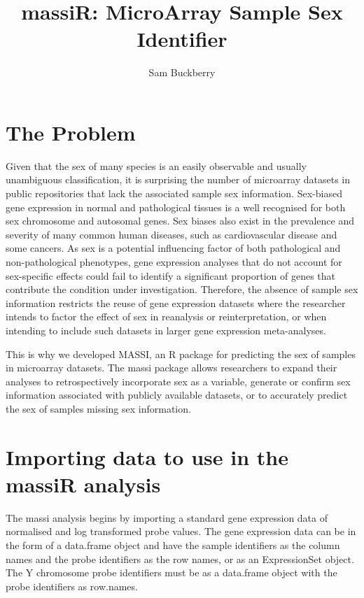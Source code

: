 \documentclass{article}
\begin{document}


\title{massiR: MicroArray Sample Sex Identifier}
\author{Sam Buckberry}
\maketitle

\section{The Problem}
Given that the sex of many species is an easily observable and usually unambiguous classification, it is surprising the number of microarray datasets in public repositories that lack the associated sample sex information. Sex-biased gene expression in normal and pathological tissues is a well recognised for both sex chromosome and autosomal genes. Sex biases also exist in the prevalence and severity of many common human diseases, such as cardiovascular disease and some cancers. As sex is a potential influencing factor of both pathological and non-pathological phenotypes, gene expression analyses that do not account for sex-specific effects could fail to identify a significant proportion of genes that contribute the condition under investigation. Therefore, the absence of sample sex information restricts the reuse of gene expression datasets where the researcher intends to factor the effect of sex in reanalysis or reinterpretation, or when intending to include such datasets in larger gene expression meta-analyses. 

This is why we developed MASSI, an R package for predicting the sex of samples in microarray datasets. The massi package allows researchers to expand their analyses to retrospectively incorporate sex as a variable, generate or confirm sex information associated with publicly available datasets, or to accurately predict the sex of samples missing sex information.
\clearpage

\section{Importing data to use in the massiR analysis}
The massi analysis begins by importing a standard gene expression data of normalised and log transformed probe values. The gene expression data can be in the form of a data.frame object and have the sample identifiers as the column names and the probe identifiers as the row names, or as an ExpressionSet object. The Y chromosome probe identifiers must be as a data.frame object with the probe identifiers as row.names.   
\end{document}
